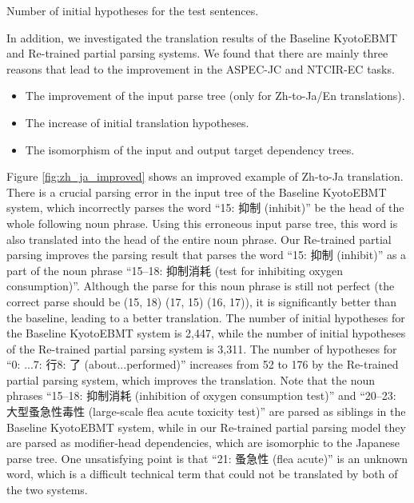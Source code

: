 \documentclass[english]{jnlp_1.4}
\begin{document}
\begin{table}[t]
\caption{Number of initial hypotheses for the test sentences.}
\label{table:hypothesis}

\end{table}

In addition, we investigated the translation results of the Baseline KyotoEBMT and Re-trained partial parsing systems.
We found that there are mainly three reasons that lead to the improvement {in the ASPEC-JC and NTCIR-EC tasks}.

\begin{itemize}
\item The improvement of the input parse tree (only for Zh-to-Ja/En translations).
\item The increase of initial translation hypotheses.
\item The isomorphism of the input and output target dependency trees.
\end{itemize}

Figure \ref{fig:zh_ja_improved} shows an improved example of Zh-to-Ja translation. 
{There is a crucial parsing error in the input tree of the Baseline KyotoEBMT system, which incorrectly
parses the word ``15: 抑制 (inhibit)'' be the head of the whole following noun phrase.
Using this erroneous input parse tree, this word is also translated into the head of the entire noun
phrase. Our Re-trained partial parsing improves the parsing result that parses the word ``15: 抑制 (inhibit)'' 
as a part of the noun phrase ``15--18: 抑制消耗 (test for inhibiting oxygen consumption)''. Although
the parse for this noun phrase is still not perfect (the correct parse should be (15, 18) (17, 15) (16, 17)), 
it is significantly better than the baseline, leading to a better translation.}
The number of initial hypotheses for the Baseline 
KyotoEBMT system is 2,447, while the number of initial hypotheses of the Re-trained partial 
parsing system is 3,311. The number of hypotheses for ``0: ...7: 行8: 了 (about...performed)'' increases
from 52 to 176 by the Re-trained partial parsing system, which improves the translation.
Note that the noun phrases
``15--18: 抑制消耗 (inhibition of oxygen consumption test)'' and ``20--23: 大型蚤急性毒性 (large-scale flea acute toxicity test)''
are parsed as siblings in the Baseline KyotoEBMT system, while in our Re-trained partial parsing model
they are parsed as modifier-head dependencies, which are isomorphic to the Japanese parse tree.
One unsatisfying point is that ``21: 蚤急性 (flea acute)'' is an unknown word, which is a difficult 
technical term that could not be translated by both of the two systems.
\end{document}
